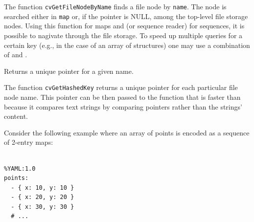 \begin{description}
\end{description}


The function \texttt{cvGetFileNodeByName} finds a file node by
\texttt{name}. The node is searched either in \texttt{map} or, if the
pointer is NULL, among the top-level file storage nodes. Using
this function for maps and  (or sequence reader)
for sequences, it is possible to nagivate through the file storage. To
speed up multiple queries for a certain key (e.g., in the case of an array
of structures) one may use a combination of  and
.

\label{GetHashedKey}

Returns a unique pointer for a given name.


\begin{description}
\end{description}

The function \texttt{cvGetHashedKey} returns a unique pointer for
each particular file node name. This pointer can be then passed to the
 function that is faster than 
because it compares text strings by comparing pointers rather than the
strings' content.

Consider the following example where an array of points is encoded as a sequence of 2-entry maps:

\begin{lstlisting}

%YAML:1.0
points:
  - { x: 10, y: 10 }
  - { x: 20, y: 20 }
  - { x: 30, y: 30 }
  # ...

\end{lstlisting}

